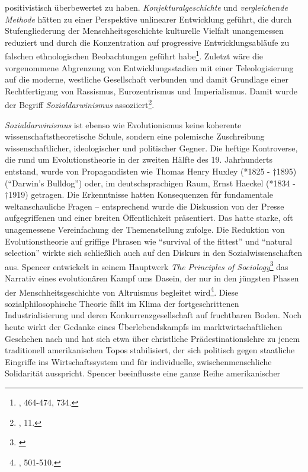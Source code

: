 \documentclass[openany,twoside,twocolumn]{book}
\let\rmarkdownfootnote\footnote%
\def\footnote{\protect\rmarkdownfootnote}
\begin{document}
positivistisch überbewertet zu haben. \emph{Konjekturalgeschichte} und
\emph{vergleichende Methode} hätten zu einer Perspektive unlinearer
Entwicklung geführt, die durch Stufengliederung der
Menschheitsgeschichte kulturelle Vielfalt unangemessen reduziert und
durch die Konzentration auf progressive Entwicklungsabläufe zu falschen
ethnologischen Beobachtungen geführt habe\footnote{\textcite{petermann_geschichte_2004},
  464-474, 734.}. Zuletzt wäre die vorgenommene Abgrenzung von
Entwicklungsstadien mit einer Teleologisierung auf die moderne,
westliche Gesellschaft verbunden und damit Grundlage einer
Rechtfertigung von Rassismus, Eurozentrismus und Imperialismus. Damit
wurde der Begriff \emph{Sozialdarwinismus} assoziiert\footnote{\textcite{ShennanGenesmemeshuman2002},
  11.}.

\emph{Sozialdarwinismus} ist ebenso wie Evolutionismus keine koherente
wissenschaftstheoretische Schule, sondern eine polemische Zuschreibung
wissenschaftlicher, ideologischer und politischer Gegner. Die heftige
Kontroverse, die rund um Evolutionstheorie in der zweiten Hälfte des 19.
Jahrhunderts entstand, wurde von Propagandisten wie Thomas Henry Huxley
(*1825 - †1895) (``Darwin's Bulldog'') oder, im deutschsprachigen Raum,
Ernst Haeckel (*1834 - †1919) getragen. Die Erkenntnisse hatten
Konsequenzen für fundamentale weltanschauliche Fragen -- entsprechend
wurde die Diskussion von der Presse aufgegriffenen und einer breiten
Öffentlichkeit präsentiert. Das hatte starke, oft unagemessene
Vereinfachung der Themenstellung zufolge. Die Reduktion von
Evolutionstheorie auf griffige Phrasen wie ``survival of the fittest''
und ``natural selection'' wirkte sich schließlich auch auf den Diskurs
in den Sozialwissenschaften aus. Spencer entwickelt in seinem Hauptwerk
\emph{The Principles of Sociology}\footnote{\textcite{SpencerHerbertSpencerPrinciples1898}}
das Narrativ eines evolutionären Kampf ums Dasein, der nur in den
jüngsten Phasen der Menschheitsgeschichte von Altruismus begleitet
wird\footnote{\textcite{petermann_geschichte_2004}, 501-510.}. Diese
sozialphilosophische Theorie fällt im Klima der fortgeschrittenen
Industrialisierung und deren Konkurrenzgesellschaft auf fruchtbaren
Boden. Noch heute wirkt der Gedanke eines Überlebendskampfs im
marktwirtschaftlichen Geschehen nach und hat sich etwa über christliche
Prädestinationslehre zu jenem traditionell amerikanischen Topos
stabilisiert, der sich politisch gegen staatliche Eingriffe ins
Wirtschaftssystem und für individuelle, zwischenmenschliche Solidarität
ausspricht. Spencer beeinflusste eine ganze Reihe amerikanischer
\end{document}
